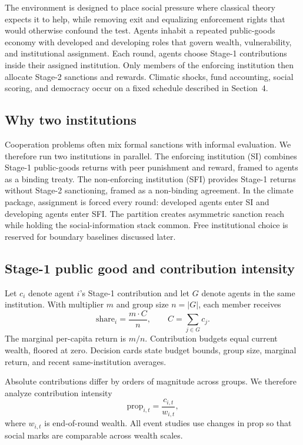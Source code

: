 The environment is designed to place social pressure where classical theory expects it to help, while removing exit and equalizing enforcement rights that would otherwise confound the test.
Agents inhabit a repeated public-goods economy with developed and developing roles that govern wealth, vulnerability, and institutional assignment.
Each round, agents choose Stage-1 contributions inside their assigned institution.
Only members of the enforcing institution then allocate Stage-2 sanctions and rewards.
Climatic shocks, fund accounting, social scoring, and democracy occur on a fixed schedule described in Section~4.

\subsection{Why two institutions}

Cooperation problems often mix formal sanctions with informal evaluation.
We therefore run two institutions in parallel.
The enforcing institution (SI) combines Stage-1 public-goods returns with peer punishment and reward, framed to agents as a binding treaty.
The non-enforcing institution (SFI) provides Stage-1 returns without Stage-2 sanctioning, framed as a non-binding agreement.
In the climate package, assignment is forced every round: developed agents enter SI and developing agents enter SFI.
The partition creates asymmetric sanction reach while holding the social-information stack common.
Free institutional choice is reserved for boundary baselines discussed later.

\subsection{Stage-1 public good and contribution intensity}

Let $c_i$ denote agent $i$'s Stage-1 contribution and let $G$ denote agents in the same institution.
With multiplier $m$ and group size $n=|G|$, each member receives
\[
\mathrm{share}_i=\frac{m\cdot C}{n},\qquad C=\sum_{j\in G}c_j.
\]
The marginal per-capita return is $m/n$.
Contribution budgets equal current wealth, floored at zero.
Decision cards state budget bounds, group size, marginal return, and recent same-institution averages.

Absolute contributions differ by orders of magnitude across groups.
We therefore analyze contribution intensity
\[
\mathrm{prop}_{i,t}=\frac{c_{i,t}}{w_{i,t}},
\]
where $w_{i,t}$ is end-of-round wealth.
All event studies use changes in $\mathrm{prop}$ so that social marks are comparable across wealth scales.

